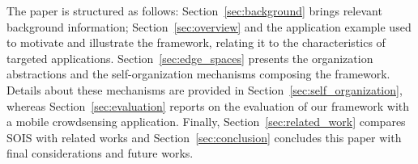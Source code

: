 The paper is structured as follows: Section~\ref{sec:background} brings relevant background information; Section~\ref{sec:overview} and the application example used to motivate and illustrate the framework, relating it to the characteristics of targeted applications. Section~\ref{sec:edge_spaces} presents the organization abstractions and the self-organization mechanisms composing the framework. Details about these mechanisms are provided in Section~\ref{sec:self_organization}, whereas Section~\ref{sec:evaluation} reports on the evaluation of our framework with a mobile crowdsensing application. Finally, Section~\ref{sec:related_work} compares SOIS with related works and Section~\ref{sec:conclusion} concludes this paper with final considerations and future works.
